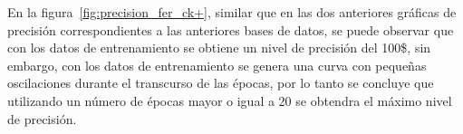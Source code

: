 En la figura~\ref{fig:precision_fer_ck+}, similar que en las dos anteriores gráficas de precisión correspondientes a las anteriores bases de datos, se puede observar que con los datos de entrenamiento se obtiene un nivel de precisión del 100\$, sin embargo, con los datos de entrenamiento se genera una curva con pequeñas oscilaciones durante el transcurso de las épocas, por lo tanto se concluye que utilizando un número de épocas mayor o igual a 20 se obtendra el máximo nivel de precisión.



